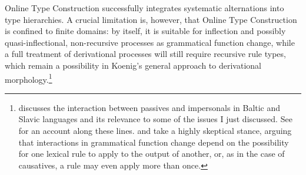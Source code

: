 \documentclass[output=paper
	        ,collection
	        ,collectionchapter
 	        ,biblatex
                ,babelshorthands
                ,newtxmath
                ,draftmode
                ,colorlinks, citecolor=brown
]{langscibook}
\begin{document}
Online Type Construction successfully integrates systematic
alternations into type hierarchies. A crucial limitation is, however,
that Online Type Construction is confined to finite domains: by itself, it is suitable for
inflection and possibly quasi-inflectional, non-recursive processes as
grammatical function change, while a full treatment of derivational
processes will still require recursive rule types, which remain a
possibility in Koenig's general approach to derivational
morphology.\footnote{\citet{Blevins2003a} discusses the interaction
  between passives and impersonals in Baltic and Slavic languages and
  its relevance to some of the issues I just discussed. See
  \citet{ASU99a-u} for an account along these lines.   and  take a
  highly skeptical stance, arguing that interactions in grammatical
  function change depend on the possibility for one lexical rule to
  apply to the output of another, or, as in the case of 
  causatives, a rule may even apply more than
  once.}
\end{document}
